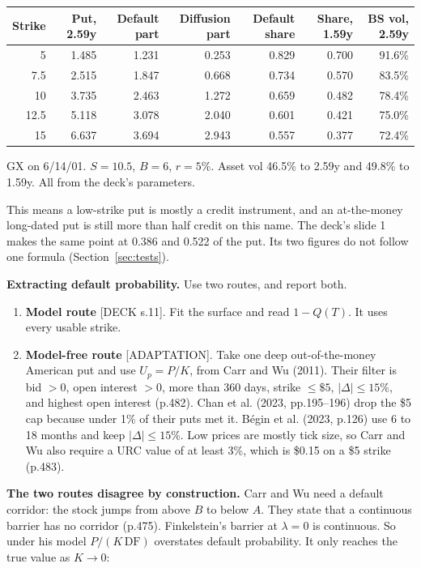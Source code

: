 \documentclass[10pt,a4paper]{article}
\newcommand{\DECK}[1]{\textsf{\footnotesize\textcolor{tagdeck}{[DECK s.#1]}}}
\newcommand{\ADAPT}{\textsf{\footnotesize\textcolor{tagadapt}{[ADAPTATION]}}}
\newcommand{\DF}{\mathrm{DF}}
\begin{document}
\begin{center}
\footnotesize
\begin{tabular}{@{}rrrrrrr@{}}
\toprule
\textbf{Strike} & \textbf{Put, 2.59y} & \textbf{Default part} & \textbf{Diffusion part} & \textbf{Default share} & \textbf{Share, 1.59y} & \textbf{BS vol, 2.59y}\\
\midrule
5 & 1.485 & 1.231 & 0.253 & 0.829 & 0.700 & 91.6\%\\
7.5 & 2.515 & 1.847 & 0.668 & 0.734 & 0.570 & 83.5\%\\
10 & 3.735 & 2.463 & 1.272 & 0.659 & 0.482 & 78.4\%\\
12.5 & 5.118 & 3.078 & 2.040 & 0.601 & 0.421 & 75.0\%\\
15 & 6.637 & 3.694 & 2.943 & 0.557 & 0.377 & 72.4\%\\
\bottomrule
\end{tabular}

\smallskip
GX on 6/14/01. $S=10.5$, $B=6$, $r=5\%$. Asset vol 46.5\% to 2.59y and 49.8\% to 1.59y. All from the deck's parameters.
\end{center}

This means a low-strike put is mostly a credit instrument, and an at-the-money long-dated put is still more than half credit on this name. The deck's slide 1 makes the same point at 0.386 and 0.522 of the put. Its two figures do not follow one formula (Section~\ref{sec:tests}).

\textbf{Extracting default probability.} Use two routes, and report both.
\begin{enumerate}[nosep]
\item \textbf{Model route} \DECK{11}. Fit the surface and read $1-Q(T)$. It uses every usable strike.
\item \textbf{Model-free route} \ADAPT. Take one deep out-of-the-money American put and use $U_p=P/K$, from Carr and Wu (2011). Their filter is bid $>0$, open interest $>0$, more than 360 days, strike $\le\$5$, $|\Delta|\le15\%$, and highest open interest (p.482). Chan et al. (2023, pp.195--196) drop the \$5 cap because under 1\% of their puts met it. B\'egin et al. (2023, p.126) use 6 to 18 months and keep $|\Delta|\le15\%$. Low prices are mostly tick size, so Carr and Wu also require a URC value of at least 3\%, which is \$0.15 on a \$5 strike (p.483).
\end{enumerate}

\textbf{The two routes disagree by construction.} Carr and Wu need a default corridor: the stock jumps from above $B$ to below $A$. They state that a continuous barrier has no corridor (p.475). Finkelstein's barrier at $\lambda=0$ is continuous. So under his model $P/(K\,\DF)$ overstates default probability. It only reaches the true value as $K\to0$:
\end{document}
